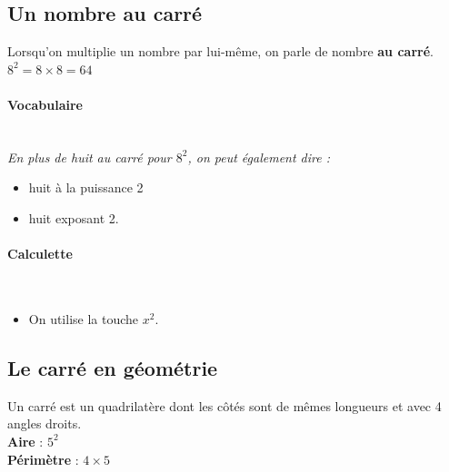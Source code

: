 \documentclass[paper=a4, fontsize=9pt]{scrartcl} %
\begin{document}
\begin{multicols}{2}

\section{Un nombre au carré}


  \begin{Definition}
    Lorsqu'on multiplie un nombre par lui-même, on parle de nombre \textbf{au carré}.\\
    $8^2 = 8 \times 8 = 64$
  \end{Definition}

  \paragraph{Vocabulaire}~~\\
  \textit{En plus de huit au carré pour $8^2$, on peut également dire :}
  \begin{itemize}	
  \item huit à la puissance 2
  \item huit exposant 2.
  \end{itemize}
  
  \paragraph{Calculette}~~\\
  \begin{itemize}	
  \item On utilise la touche $x^2$.
  \end{itemize}


 \subsection{Le carré en géométrie}
 
 \begin{Definition}
	Un carré est un quadrilatère dont les côtés sont de mêmes longueurs et avec 4 angles droits.\\
	\textbf{Aire} : $5^2$\\
	\textbf{Périmètre} : $4 \times 5$
\end{Definition}


\end{multicols}
\end{document}
